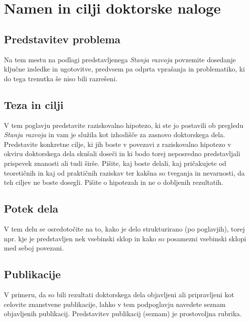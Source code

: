 \chapter{Namen in cilji doktorske naloge}\label{cha:namen}

\section{Predstavitev problema}\label{sec:predstavitev_problema}
Na tem mestu na podlagi predstavljenega \emph{Stanja razvoja} povzemite dosedanje ključne izsledke in ugotovitve, predvsem pa odprta vprašanja in problematiko, ki do tega trenutka še niso bili razrešeni.

\section{Teza in cilji}\label{sec:teza}
V tem poglavju predstavite raziskovalno hipotezo, ki ste jo postavili ob pregledu \emph{Stanja razvoja} in vam je služila kot izhodišče za zasnovo doktorskega dela. Predstavite konkretne cilje, ki jih boste v povezavi z raziskovalno hipotezo v okviru doktorskega dela skušali doseči in ki bodo torej neposredno predstavljali prispevek znanosti ali tudi širše. Pišite, kaj boste delali, kaj pričakujete od teoretičnih in kaj od praktičnih raziskav ter kakšna so tveganja in nevarnosti, da teh ciljev ne boste dosegli. Pišite o hipotezah in ne o dobljenih rezultatih.

\section{Potek dela}\label{sec:potek}
V tem delu se osredotočite na to, kako je delo strukturirano (po poglavjih), torej npr. kje je predstavljen nek vsebinski sklop in kako so posamezni vsebinski sklopi med seboj povezani.

\section{Publikacije}\label{sec:publikacije}
V primeru, da so bili rezultati doktorskega dela objavljeni ali pripravljeni kot celovite znanstvene publikacije, lahko v tem podpoglavju navedete seznam objavljenih publikacij. Predstavitev publikacij (seznam) je prostovoljna rubrika.